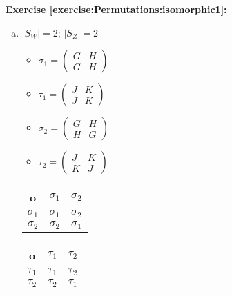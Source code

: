 \noindent\textbf{Exercise \ref{exercise:Permutations:isomorphic1}:} 
\begin{enumerate}[(a)]
\item
$|S_W| = 2$; $|S_Z| = 2$\\
	\begin{multicols}{2}
	\begin{itemize}
	\item
	$\sigma_1 = \begin{pmatrix}
	G & H\\
	G & H
	\end{pmatrix}$

	\item
	$\tau_1 = \begin{pmatrix}
	J & K\\
	J & K
	\end{pmatrix}$

	\item
	$\sigma_2 = \begin{pmatrix}
	G & H\\
	H & G
	\end{pmatrix}$

	\item
	$\tau_2 = \begin{pmatrix}
	J & K\\
	K & J
	\end{pmatrix}$\\	
	\end{itemize}
	\end{multicols}
	
	\begin{multicols}{2}
	\begin{tabular}{c| c c }
		o & $\sigma_1$ & $\sigma_2$\\
		\hline
		$\sigma_1$ & $\sigma_1$ & $\sigma_2$\\
		$\sigma_2$ & $\sigma_2$ & $\sigma_1$\\
	\end{tabular}

	\begin{tabular}{c| c c }
		o & $\tau_1$ & $\tau_2$ \\
		\hline
		$\tau_1$ & $\tau_1$ & $\tau_2$\\
		$\tau_2$ & $\tau_2$ & $\tau_1$\\
	\end{tabular}
	\end{multicols}
	

\end{enumerate}
